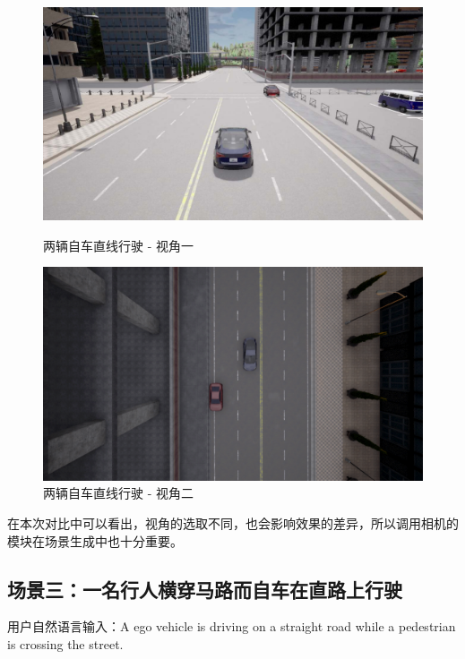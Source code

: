 \vspace{1em}

\begin{figure}[H]
	\centering
	\begin{minipage}[t]{0.48\textwidth}
		\centering
		\includegraphics[width=\linewidth]{"images/场景7.pdf"}
		\caption{两辆自车直线行驶 - 视角一}
		\label{fig:scene7_1}
	\end{minipage}%
	\hfill
	\begin{minipage}[t]{0.48\textwidth}
		\centering
		\includegraphics[width=\linewidth]{"images/场景7.1.png"}
		\caption{两辆自车直线行驶 - 视角二}
		\label{fig:scene7_2}
	\end{minipage}
\end{figure}
在本次对比中可以看出，视角的选取不同，也会影响效果的差异，所以调用相机的模块在场景生成中也十分重要。
\subsection{场景三：一名行人横穿马路而自车在直路上行驶}
用户自然语言输入：A ego vehicle is driving on a straight road while a pedestrian is crossing the street.

